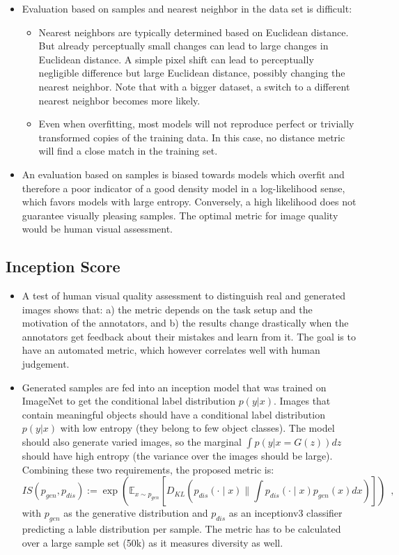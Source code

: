 \documentclass{article}
\begin{document}
\begin{itemize}
\begin{itemize}
    \end{itemize}
    \item Evaluation based on samples and nearest neighbor in the data set is difficult:
    \begin{itemize}
        \item Nearest neighbors are typically determined based on Euclidean distance. But already perceptually small changes can lead to large changes in Euclidean distance. A simple pixel shift can lead to perceptually negligible difference but large Euclidean distance, possibly changing the nearest neighbor. Note that with a bigger dataset, a switch to a different nearest neighbor becomes more likely.
        \item Even when overfitting, most models will not reproduce perfect or trivially transformed copies of the training data. In this case, no distance metric will find a close match in the training set.
    \end{itemize}
    \item An evaluation based on samples is biased towards models which overfit and therefore a poor indicator of a good density model in a log-likelihood sense, which favors models with large entropy. Conversely, a high likelihood does not guarantee visually pleasing samples. %
    The optimal metric for image quality would be human visual assessment. 
\end{itemize}

\subsection{Inception Score}
\begin{itemize}
    \item A test of human visual quality assessment to distinguish real and generated images shows that: a) the metric depends on the task setup and the motivation of the annotators, and b) the results change drastically when the annotators get feedback about their mistakes and learn from it. The goal is to have an automated metric, which however correlates well with human judgement.
    \item Generated samples are fed into an inception model that was trained on ImageNet to get the conditional label distribution $p(y|x)$. Images that contain meaningful objects should have a conditional label distribution $p(y|x)$ with low entropy (they belong to few object classes). The model should also generate varied images, so the marginal $∫ p(y|x = G(z))dz$ should have high entropy (the variance over the images should be large). Combining these two requirements, the proposed metric is: 
    $$
    I S\left(p_{g e n}, p_{d i s}\right):=\exp \left(\mathbb{E}_{x \sim p_{g e n}}\left[D_{K L}\left(p_{d i s}(\cdot \mid x) \| \int p_{d i s}(\cdot \mid x) p_{g e n}(x) d x\right)\right]\right)\enspace,
    $$ with $p_{g e n}$ as the generative distribution and $p_{d i s}$ as an inceptionv3 classifier predicting a lable distribution per sample.
    The metric has to be calculated over a large sample set (50k) as it measures diversity as well.
\end{itemize}
\end{document}
